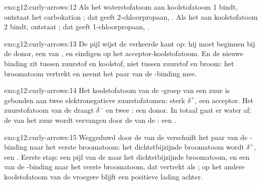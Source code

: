 \begin{solution}{exo:g12:curly-arrows:12}
Als het waterstofatoom aan koolstofatoom 1 bindt, ontstaat het
carbokation ; dat geeft 2-chloorpropaan,
. Als het aan koolstofatoom 2 bindt, ontstaat
; dat geeft 1-chloorpropaan, .
\end{solution}

\begin{solution}{exo:g12:curly-arrows:13}
De pijl wijst de verkeerde kant op: hij moet beginnen bij de donor, een
 van , en eindigen op het acceptor-koolstofatoom.
En de nieuwe binding zit tussen zuurstof en koolstof, niet tussen
zuurstof en broom: het broomatoom vertrekt en neemt het paar van de
-binding mee.
\end{solution}

\begin{solution}{exo:g12:curly-arrows:14}
Het koolstofatoom van de -groep van een zuur is gebonden aan twee
elektronegatieve zuurstofatomen: sterk $\delta^+$, een acceptor. Het
zuurstofatoom van de  draagt $\delta^-$ en twee : een donor. In totaal gaat er water af; de  van
het zuur wordt vervangen door de  van de : een
.
\end{solution}

\begin{solution}{exo:g12:curly-arrows:15}
Weggeduwd door de  van de  verschuift het paar
van de -binding naar het verste broomatoom: het dichtstbijzijnde
broomatoom wordt $\delta^+$, een . Eerste stap: een pijl van
de  naar het dichtstbijzijnde broomatoom, en een van de
-binding naar het verste broomatoom, dat vertrekt als
; op het andere koolstofatoom van de vroegere 
blijft een positieve lading achter.
\end{solution}

